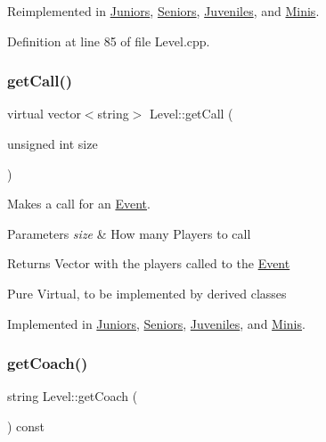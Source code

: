 Reimplemented in \hyperlink{class_juniors_a23915dab5b0c30a978f08a653483db53}{Juniors}, \hyperlink{class_seniors_a4ee5683212625ee909b5c04d08bc8823}{Seniors}, \hyperlink{class_juveniles_a596c6380325142d8c49c8d8db7b9fa31}{Juveniles}, and \hyperlink{class_minis_a75f45698aaf057d11e083694bfd31d17}{Minis}.



Definition at line 85 of file Level.\+cpp.

\hypertarget{class_level_ac118b390f16a75b9a0e9df198b3190ad}{}\label{class_level_ac118b390f16a75b9a0e9df198b3190ad} 
\subsubsection{\texorpdfstring{get\+Call()}{getCall()}}
{\footnotesize\ttfamily virtual vector$<$string$>$ Level\+::get\+Call (\begin{DoxyParamCaption}\item[{unsigned int}]{size }\end{DoxyParamCaption})\hspace{0.3cm}{\ttfamily [pure virtual]}}



Makes a call for an \hyperlink{class_event}{Event}. 


\begin{DoxyParams}{Parameters}
{\em size} & How many Players to call \\
\hline
\end{DoxyParams}
\begin{DoxyReturn}{Returns}
Vector with the players called to the \hyperlink{class_event}{Event}
\end{DoxyReturn}
Pure Virtual, to be implemented by derived classes 

Implemented in \hyperlink{class_juniors_ace1da8267f2a92dbfb9e27f7b6b95d26}{Juniors}, \hyperlink{class_seniors_a3b2fbe1e5d735c7659a195cea6333a0b}{Seniors}, \hyperlink{class_juveniles_a062cff0b64c844c3e9cc9b41e768cce6}{Juveniles}, and \hyperlink{class_minis_ad2c86c585b05e735bb6e38f672b9bbab}{Minis}.

\hypertarget{class_level_a6c4d3f153c3285aeaf3ec954981c5be8}{}\label{class_level_a6c4d3f153c3285aeaf3ec954981c5be8} 
\subsubsection{\texorpdfstring{get\+Coach()}{getCoach()}}
{\footnotesize\ttfamily string Level\+::get\+Coach (\begin{DoxyParamCaption}{ }\end{DoxyParamCaption}) const\hspace{0.3cm}{\ttfamily [inline]}}



